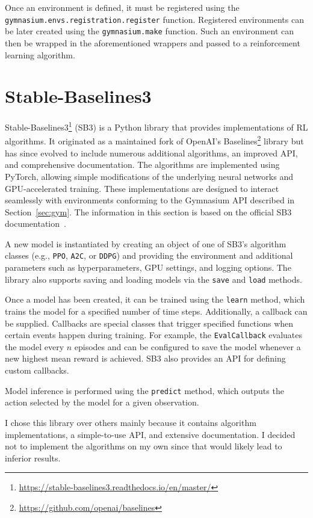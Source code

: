 \documentclass[
  digital,     %
  oneside,     %
  nosansbold,  %
  nocolorbold, %
  lof,         %
  lot,         %
]{fithesis4}
\begin{document}
Once an environment is defined, it must be registered using the \texttt{gymnasium.envs.registration.register} function. Registered environments can be later created using the \texttt{gymnasium.make} function. Such an environment can then be wrapped in the aforementioned wrappers and passed to a reinforcement learning algorithm.

\section{Stable-Baselines3}
Stable-Baselines3\footnote{\url{https://stable-baselines3.readthedocs.io/en/master/}} (SB3) is a Python library that provides implementations of RL algorithms. It originated as a maintained fork of OpenAI's Baselines\footnote{\url{https://github.com/openai/baselines}} library but has since evolved to include numerous additional algorithms, an improved API, and comprehensive documentation. The algorithms are implemented using PyTorch, allowing simple modifications of the underlying neural networks and GPU-accelerated training. These implementations are designed to interact seamlessly with environments conforming to the Gymnasium API described in Section~\ref{sec:gym}. The information in this section is based on the official SB3 documentation~\cite{SB3-docs}.

A new model is instantiated by creating an object of one of SB3’s algorithm classes (e.g., \texttt{PPO}, \texttt{A2C}, or \texttt{DDPG}) and providing the environment and additional parameters such as hyperparameters, GPU settings, and logging options. The library also supports saving and loading models via the \texttt{save} and \texttt{load} methods.

Once a model has been created, it can be trained using the \texttt{learn} method, which trains the model for a specified number of time steps. Additionally, a callback can be supplied. Callbacks are special classes that trigger specified functions when certain events happen during training. For example, the \texttt{EvalCallback} evaluates the model every $n$ episodes and can be configured to save the model whenever a new highest mean reward is achieved. SB3 also provides an API for defining custom callbacks.

Model inference is performed using the \texttt{predict} method, which outputs the action selected by the model for a given observation.

I chose this library over others mainly because it contains algorithm implementations, a simple-to-use API, and extensive documentation. I decided not to implement the algorithms on my own since that would likely lead to inferior results.
\end{document}
